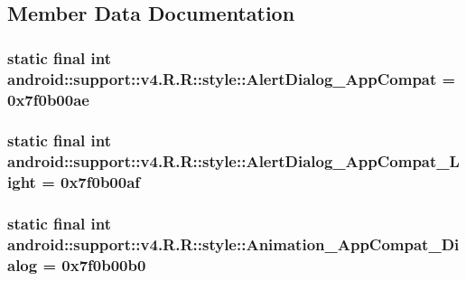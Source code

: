 \subsection{Member Data Documentation}
\hypertarget{classandroid_1_1support_1_1v4_1_1_r_1_1style_ba2e4db805b21c564cddf9f822504a02}{
\subsubsection[{AlertDialog\_\-AppCompat}]{\setlength{\rightskip}{0pt plus 5cm}static final int android::support::v4.R.R::style::AlertDialog\_\-AppCompat = 0x7f0b00ae}}
\label{classandroid_1_1support_1_1v4_1_1_r_1_1style_ba2e4db805b21c564cddf9f822504a02}


\hypertarget{classandroid_1_1support_1_1v4_1_1_r_1_1style_80de99cfd4ddf02c0e3af93aec85c89d}{
\subsubsection[{AlertDialog\_\-AppCompat\_\-Light}]{\setlength{\rightskip}{0pt plus 5cm}static final int android::support::v4.R.R::style::AlertDialog\_\-AppCompat\_\-Light = 0x7f0b00af}}
\label{classandroid_1_1support_1_1v4_1_1_r_1_1style_80de99cfd4ddf02c0e3af93aec85c89d}


\hypertarget{classandroid_1_1support_1_1v4_1_1_r_1_1style_4906f4b429ad47327a9f4d1145ab386f}{
\subsubsection[{Animation\_\-AppCompat\_\-Dialog}]{\setlength{\rightskip}{0pt plus 5cm}static final int android::support::v4.R.R::style::Animation\_\-AppCompat\_\-Dialog = 0x7f0b00b0}}
\label{classandroid_1_1support_1_1v4_1_1_r_1_1style_4906f4b429ad47327a9f4d1145ab386f}


